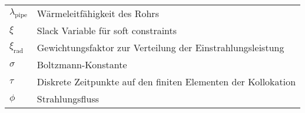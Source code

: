 \begin{table}[ht!]
\begin{tabular}{m{}m{}}
        $\lambda_{\mathrm{pipe}}$               & Wärmeleitfähigkeit des Rohrs                                  \\
        $\xi$                                   & Slack Variable für soft constraints                           \\
        $\xi_{\mathrm{rad}}$                    & Gewichtungsfaktor zur Verteilung der Einstrahlungsleistung    \\
        $\sigma$                                & Boltzmann-Konstante                                           \\
        $\tau$                                  & Diskrete Zeitpunkte auf den finiten Elementen der Kollokation \\
        $\phi$                                  & Strahlungsfluss                                               \\
    \end{tabular}
\end{table}
\clearpage
\newpage \vspace*{-1cm}

\renewcommand{\arraystretch}{0.93}

